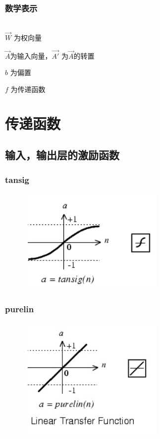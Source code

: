 \documentclass[slidestop,compress,mathserif,c]{beamer}
\begin{document}
\begin{frame}
\frametitle{数学表示}
~\\[1cm]
$ \vec{W} $ 为权向量

$ \vec{A} $为输入向量，$\vec{A'} $ 为$\vec{A}$的转置

$b$ 为偏置

$f$ 为传递函数
\end{frame}
\section{传递函数}
\subsection{输入，输出层的激励函数}
\begin{frame}
\frametitle{tansig}
\begin{figure}
\centering
\includegraphics[width=7cm]{tansig_TFMATLAB}
\end{figure}

\end{frame}

\begin{frame}
\frametitle{purelin}
\begin{figure}
\centering
\includegraphics[width=7cm]{purelin}
\end{figure}
\end{frame}
\end{document}
